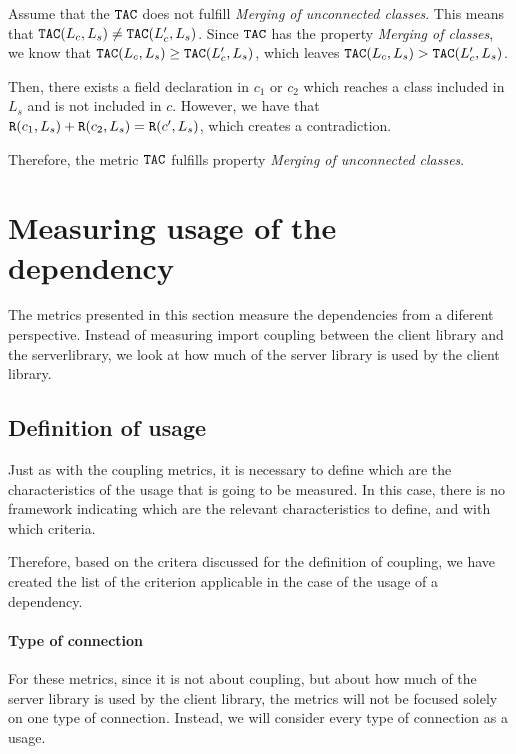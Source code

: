 Assume that the $\verb|TAC|$ does not fulfill \textit{Merging of unconnected classes}. This means that $\verb|TAC|(L_c, L_s) \neq \verb|TAC|(L_c', L_s)$. Since $\verb|TAC|$ has the property \textit{Merging of classes}, we know that $\verb|TAC|(L_c, L_s) \geq \verb|TAC|(L_c', L_s)$, which leaves $\verb|TAC|(L_c, L_s) > \verb|TAC|(L_c', L_s)$.

Then, there exists a field declaration in $c_1$ or $c_2$ which reaches a class included in $L_s$ and is not included in $c$. However, we have that $\verb|R|(c_1, L_s) + \verb|R|(c_2, L_s) = \verb|R|(c', L_s)$, which creates a contradiction.

Therefore, the metric $\verb|TAC|$ fulfills property \textit{Merging of unconnected classes}.

\section{Measuring usage of the dependency}
The metrics presented in this section measure the dependencies from a diferent perspective. Instead of measuring import coupling between the client library and the serverlibrary, we look at how much of the server library is used by the client library.


\subsection{Definition of usage}\label{subsect:usage-definition}
Just as with the coupling metrics, it is necessary to define which are the characteristics of the usage that is going to be measured. In this case, there is no framework indicating which are the relevant characteristics to define, and with which criteria.

Therefore, based on the critera discussed for the definition of coupling, we have created the list of the criterion applicable in the case of the usage of a dependency.

\paragraph{Type of connection}
For these metrics, since it is not about coupling, but about how much of the server library is used by the client library, the metrics will not be focused solely on one type of connection. Instead, we will consider every type of connection as a usage.

